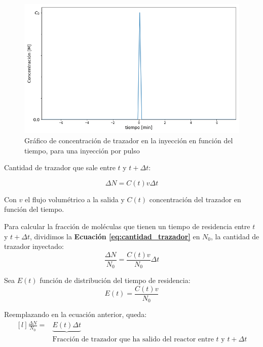         \begin{figure}
            \centering
            \includegraphics[width=.6\textwidth]{img/graficos/inyeccion_pulso.png}
            \caption{Gráfico de concentración de trazador en la inyección en función del tiempo, para una inyección por pulso}
            \label{fig:inyeccion_pulso}
        \end{figure}
        
        Cantidad de trazador que sale entre \(t\) y \(t + \Delta t\):
        
        \begin{equation}
        \label{eq:cantidad_trazador}
            \Delta N = C(t) v \Delta t
        \end{equation}
        
        Con \(v\) el flujo volumétrico a la salida y \(C(t)\) concentración del trazador en función del tiempo.
        
        Para calcular la fracción de moléculas que tienen un tiempo de residencia entre \(t\) y \(t + \Delta t\), dividimos la \textbf{Ecuación \ref{eq:cantidad_trazador}} en \(N_{0}\), la cantidad de trazador inyectado:
        \[\frac{\Delta N}{N_{0}} = \frac{C(t) v}{N_{0}} \Delta t\]
        
        Sea \(E(t)\) función de distribución del tiempo de residencia:
        \begin{equation}
        \label{eq:funcion_dist_tiempo_de_residencia}
            E(t) = \frac{C(t)v}{N_{0}}
        \end{equation}
        
        Reemplazando en la ecuación anterior, queda:
        \begin{equation}
        \label{eq:fraccion_trazador_salida_reactor_pulso}
            \begin{matrix*}[l]
                 \frac{\Delta N}{N_{0}} = & \underbrace{E(t) \Delta t} \\
                  & \text{Fracción de trazador que ha salido del reactor entre } t \text{ y } t + \Delta t
            \end{matrix*}
        \end{equation}
        
